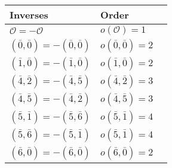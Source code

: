 \begin{tabular}{l|ll}
        Inverses & Order \\
 \hline
        $\mathcal{O}=-\mathcal{O}$ & $o(\mathcal{O})=1$ \\
        $(\bar{0},\bar{0})=-(\bar{0},\bar{0})$ & $o(\bar{0},\bar{0})=2$ \\
        $(\bar{1},\bar{0})=-(\bar{1},\bar{0})$ & $o(\bar{1},\bar{0})=2$ \\
        $(\bar{4},\bar{2})=-(\bar{4},\bar{5})$ & $o(\bar{4},\bar{2})=3$ \\
        $(\bar{4},\bar{5})=-(\bar{4},\bar{2})$ & $o(\bar{4},\bar{5})=3$ \\
        $(\bar{5},\bar{1})=-(\bar{5},\bar{6})$ & $o(\bar{5},\bar{1})=4$ \\
        $(\bar{5},\bar{6})=-(\bar{5},\bar{1})$ & $o(\bar{5},\bar{1})=4$ \\
        $(\bar{6},\bar{0})=-(\bar{6},\bar{0})$ & $o(\bar{6},\bar{0})=2$ \\
\end{tabular}